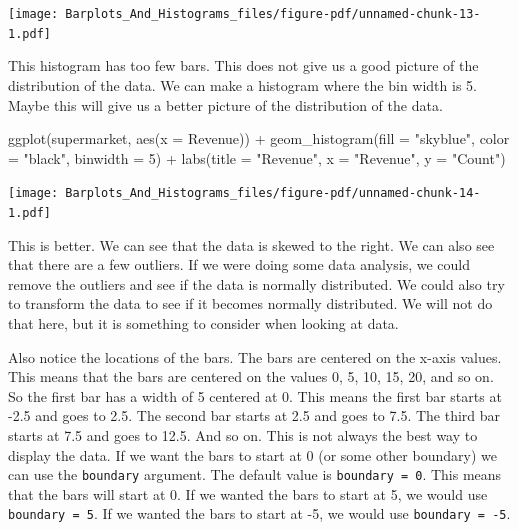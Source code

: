 \documentclass[
  letterpaper,
  DIV=11,
  numbers=noendperiod]{scrreprt}
\newenvironment{Shaded}{\begin{snugshade}}{\end{snugshade}}
\newcommand{\AttributeTok}[1]{\textcolor[rgb]{0.40,0.45,0.13}{#1}}
\newcommand{\DecValTok}[1]{\textcolor[rgb]{0.68,0.00,0.00}{#1}}
\newcommand{\FunctionTok}[1]{\textcolor[rgb]{0.28,0.35,0.67}{#1}}
\newcommand{\NormalTok}[1]{\textcolor[rgb]{0.00,0.23,0.31}{#1}}
\newcommand{\SpecialCharTok}[1]{\textcolor[rgb]{0.37,0.37,0.37}{#1}}
\newcommand{\StringTok}[1]{\textcolor[rgb]{0.13,0.47,0.30}{#1}}
\begin{document}
\texttt{[image: Barplots\_And\_Histograms\_files/figure-pdf/unnamed-chunk-13-1.pdf]}

This histogram has too few bars. This does not give us a good picture of
the distribution of the data. We can make a histogram where the bin
width is 5. Maybe this will give us a better picture of the distribution
of the data.

\begin{Shaded}
\begin{Highlighting}[]
\FunctionTok{ggplot}\NormalTok{(supermarket, }\FunctionTok{aes}\NormalTok{(}\AttributeTok{x =} \StringTok{\textasciigrave{}}\AttributeTok{Revenue}\StringTok{\textasciigrave{}}\NormalTok{)) }\SpecialCharTok{+}
  \FunctionTok{geom\_histogram}\NormalTok{(}\AttributeTok{fill =} \StringTok{"skyblue"}\NormalTok{, }\AttributeTok{color =} \StringTok{"black"}\NormalTok{, }\AttributeTok{binwidth =} \DecValTok{5}\NormalTok{) }\SpecialCharTok{+}
  \FunctionTok{labs}\NormalTok{(}\AttributeTok{title =} \StringTok{"Revenue"}\NormalTok{,}
       \AttributeTok{x =} \StringTok{"Revenue"}\NormalTok{,}
       \AttributeTok{y =} \StringTok{"Count"}\NormalTok{)}
\end{Highlighting}
\end{Shaded}

\texttt{[image: Barplots\_And\_Histograms\_files/figure-pdf/unnamed-chunk-14-1.pdf]}

This is better. We can see that the data is skewed to the right. We can
also see that there are a few outliers. If we were doing some data
analysis, we could remove the outliers and see if the data is normally
distributed. We could also try to transform the data to see if it
becomes normally distributed. We will not do that here, but it is
something to consider when looking at data.

Also notice the locations of the bars. The bars are centered on the
x-axis values. This means that the bars are centered on the values 0, 5,
10, 15, 20, and so on. So the first bar has a width of 5 centered at 0.
This means the first bar starts at -2.5 and goes to 2.5. The second bar
starts at 2.5 and goes to 7.5. The third bar starts at 7.5 and goes to
12.5. And so on. This is not always the best way to display the data. If
we want the bars to start at 0 (or some other boundary) we can use the
\texttt{boundary} argument. The default value is
\texttt{boundary\ =\ 0}. This means that the bars will start at 0. If we
wanted the bars to start at 5, we would use \texttt{boundary\ =\ 5}. If
we wanted the bars to start at -5, we would use
\texttt{boundary\ =\ -5}.
\end{document}
